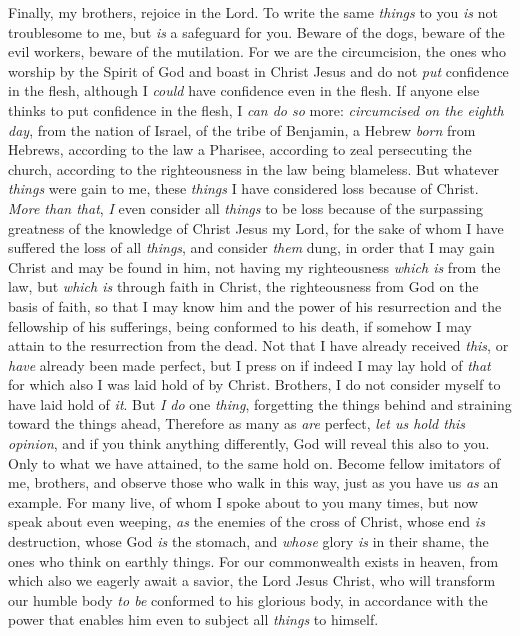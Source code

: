\begin{biblechapter} %
 Finally, my brothers, rejoice in the Lord. To write the same \textit{things} to you \textit{is} not troublesome to me, but \textit{is} a safeguard for you.
\verse Beware of the dogs, beware of the evil workers, beware of the mutilation.
\verse For we are the circumcision, the ones who worship by the Spirit of God and boast in Christ Jesus and do not \textit{put} confidence in the flesh,
\verse although I \textit{could} have confidence even in the flesh.
 If anyone else thinks to put confidence in the flesh, I \textit{can do so} more:
\verse \textit{circumcised on the eighth day}, from the nation of Israel, of the tribe of Benjamin, a Hebrew \textit{born} from Hebrews, according to the law a Pharisee,
\verse according to zeal persecuting the church, according to the righteousness in the law being blameless.
\verse But whatever \textit{things} were gain to me, these \textit{things} I have considered loss because of Christ.
\verse \textit{More than that}, \textit{I} even consider all \textit{things} to be loss because of the surpassing greatness of the knowledge of Christ Jesus my Lord, for the sake of whom I have suffered the loss of all \textit{things}, and consider \textit{them} dung, in order that I may gain Christ
\verse and may be found in him, not having my righteousness \textit{which is} from the law, but \textit{which is} through faith in Christ, the righteousness from God on the basis of faith,
\verse so that I may know him and the power of his resurrection and the fellowship of his sufferings, being conformed to his death,
\verse if somehow I may attain to the resurrection from the dead.
\verse Not that I have already received \textit{this}, or \textit{have} already been made perfect, but I press on if indeed I may lay hold of \textit{that} for which also I was laid hold of by Christ.
\verse Brothers, I do not consider myself to have laid hold of \textit{it}. But \textit{I do} one \textit{thing}, forgetting the things behind and straining toward the things ahead,
 Therefore as many as \textit{are} perfect, \textit{let us hold this opinion}, and if you think anything differently, God will reveal this also to you.
\verse Only to what we have attained, to the same hold on.
\verse Become fellow imitators of me, brothers, and observe those who walk in this way, just as you have us \textit{as} an example.
\verse For many live, of whom I spoke about to you many times, but now speak about even weeping, \textit{as} the enemies of the cross of Christ,
\verse whose end \textit{is} destruction, whose God \textit{is} the stomach, and \textit{whose} glory \textit{is} in their shame, the ones who think on earthly things.
\verse For our commonwealth exists in heaven, from which also we eagerly await a savior, the Lord Jesus Christ,
\verse who will transform our humble body \textit{to be} conformed to his glorious body, in accordance with the power that enables him even to subject all \textit{things} to himself.
\end{biblechapter}

